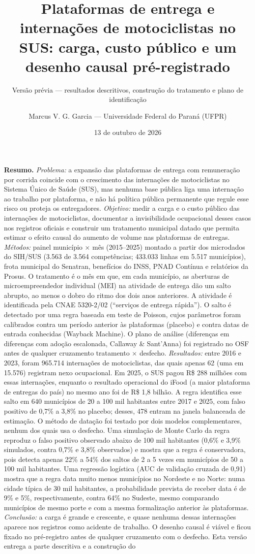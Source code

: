 \documentclass[
  11pt,
]{article}
\title{Plataformas de entrega e internações de motociclistas no SUS: carga, custo público e um desenho causal pré-registrado}
\subtitle{Versão prévia --- resultados descritivos, construção do tratamento e plano de identificação}
\author{Marcus V. G. Garcia --- Universidade Federal do Paraná (UFPR)}
\date{13 de outubro de 2026}
\begin{document}
\maketitle

\textbf{Resumo.} \emph{Problema:} a expansão das plataformas de entrega com remuneração por corrida coincide com o crescimento das internações de motociclistas no Sistema Único de Saúde (SUS), mas nenhuma base pública liga uma internação ao trabalho por plataforma, e não há política pública permanente que regule esse risco ou proteja os entregadores. \emph{Objetivo:} medir a carga e o custo público das internações de motociclistas, documentar a invisibilidade ocupacional desses casos nos registros oficiais e construir um tratamento municipal datado que permita estimar o efeito causal do aumento de volume nas plataformas de entregas. \emph{Métodos:} painel município × mês (2015--2025) montado a partir dos microdados do SIH/SUS (3.563 de 3.564 competências; 433.033 linhas em 5.517 municípios), frota municipal do Senatran, benefícios do INSS, PNAD Contínua e relatórios da Prosus. O tratamento é o mês em que, em cada município, as aberturas de microempreendedor individual (MEI) na atividade de entrega dão um salto abrupto, ao menos o dobro do ritmo dos dois anos anteriores. A atividade é identificada pela CNAE 5320-2/02 (``serviços de entrega rápida''). O salto é detectado por uma regra baseada em teste de Poisson, cujos parâmetros foram calibrados contra um período anterior às plataformas (placebo) e contra datas de entrada conhecidas (Wayback Machine). O plano de análise (diferenças em diferenças com adoção escalonada, Callaway \& Sant'Anna) foi registrado no OSF antes de qualquer cruzamento tratamento × desfecho. \emph{Resultados:} entre 2016 e 2023, foram 965.714 internações de motociclistas, das quais apenas 62 (uma em 15.576) registram nexo ocupacional. Em 2025, o SUS pagou R\$ 288 milhões com essas internações, enquanto o resultado operacional do iFood (a maior plataforma de entregas do país) no mesmo ano foi de R\$ 1,8 bilhão. A regra identifica esse salto em 640 municípios de 20 a 100 mil habitantes entre 2017 e 2025, com falso positivo de 0,7\% a 3,8\% no placebo; desses, 478 entram na janela balanceada de estimação. O método de datação foi testado por dois modelos complementares, nenhum dos quais usa o desfecho. Uma simulação de Monte Carlo da regra reproduz o falso positivo observado abaixo de 100 mil habitantes (0,6\% e 3,9\% simulados, contra 0,7\% e 3,8\% observados) e mostra que a regra é conservadora, pois detecta apenas 22\% a 54\% dos saltos de 2 a 5 vezes em municípios de 50 a 100 mil habitantes. Uma regressão logística (AUC de validação cruzada de 0,91) mostra que a regra data muito menos municípios no Nordeste e no Norte: numa cidade típica de 30 mil habitantes, a probabilidade prevista de receber data é de 9\% e 5\%, respectivamente, contra 64\% no Sudeste, mesmo comparando municípios de mesmo porte e com a mesma formalização anterior às plataformas. \emph{Conclusão:} a carga é grande e crescente, e quase nenhuma dessas internações aparece nos registros como acidente de trabalho. O desenho causal é viável e ficou fixado no pré-registro antes de qualquer cruzamento com o desfecho. Esta versão entrega a parte descritiva e a construção do 
\end{document}
